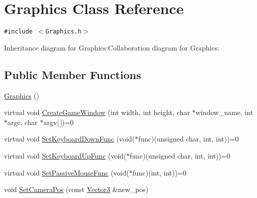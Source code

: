 \hypertarget{class_graphics}{
\section{Graphics Class Reference}
\label{class_graphics}
}
{\tt \#include $<$Graphics.h$>$}

Inheritance diagram for Graphics:Collaboration diagram for Graphics:\subsection*{Public Member Functions}
\begin{CompactItemize}
\item 
\hyperlink{class_graphics_f2e8fe67fd31ec263c843a6e28b29d3c}{Graphics} ()
\item 
virtual void \hyperlink{class_graphics_1683212d612a49e39003b2c4def5f5ec}{CreateGameWindow} (int width, int height, char $\ast$window\_\-name, int $\ast$argc, char $\ast$argv\mbox{[}$\,$\mbox{]})=0
\item 
virtual void \hyperlink{class_graphics_62d9789ca0d11aa4f46847557281550f}{SetKeyboardDownFunc} (void($\ast$func)(unsigned char, int, int))=0
\item 
virtual void \hyperlink{class_graphics_6e992aa56d2b7f97b991d776dc808d25}{SetKeyboardUpFunc} (void($\ast$func)(unsigned char, int, int))=0
\item 
virtual void \hyperlink{class_graphics_c015a0e21a8880c52f12bc0d05cb8735}{SetPassiveMouseFunc} (void($\ast$func)(int, int))=0
\item 
void \hyperlink{class_graphics_a9ef00ac25e4a1985fa5a4250efb1f5b}{SetCameraPos} (const \hyperlink{class_vector3}{Vector3} \&new\_\-pos)
\end{CompactItemize}
